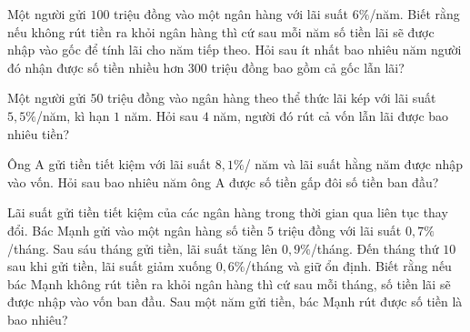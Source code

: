 \begin{ex}%
	Một người gửi $100$ triệu đồng vào một ngân hàng với lãi suất $6\%$/năm. Biết rằng nếu không rút tiền ra khỏi ngân hàng thì cứ sau mỗi năm số tiền lãi sẽ  được nhập vào gốc để tính lãi cho năm tiếp theo. Hỏi sau ít nhất bao nhiêu năm người đó nhận được số tiền nhiều hơn $300$ triệu đồng bao gồm cả gốc lẫn lãi?
\end{ex}

\begin{ex}%
	Một người gửi $50$ triệu đồng vào ngân hàng theo thể thức  lãi kép với lãi suất $5{,}5\%$/năm, kì hạn $1$ năm. Hỏi sau $4$ năm, người đó rút cả vốn lẫn lãi được bao nhiêu tiền?
\end{ex}

\begin{ex}%
	Ông A gửi tiền  tiết kiệm với lãi suất $8{,}1\%$/ năm và lãi suất hằng năm được nhập vào vốn. Hỏi sau bao nhiêu năm ông A được số tiền gấp đôi số tiền ban đầu?
\end{ex}

\begin{ex}%
	Lãi suất gửi tiền tiết kiệm  của các ngân hàng trong thời gian qua liên tục thay đổi. Bác Mạnh gửi vào một ngân hàng số tiền $5$ triệu đồng với lãi suất $0{,}7\%$/tháng. Sau sáu tháng gửi tiền, lãi suất tăng lên $0{,}9\%$/tháng. Đến tháng thứ $10$ sau khi gửi tiền, lãi suất giảm xuống $0{,}6\%$/tháng và giữ ổn định. Biết rằng nếu bác Mạnh không rút tiền ra khỏi ngân hàng thì cứ sau mỗi tháng, số tiền lãi sẽ được nhập vào vốn ban đầu. Sau một năm gửi tiền, bác Mạnh rút được số tiền là bao nhiêu?
\end{ex}

